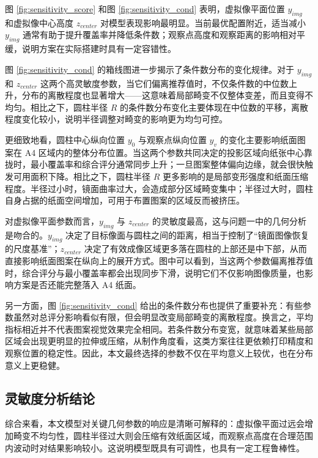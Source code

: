 \documentclass[a4paper,12pt]{ctexart}
\begin{document}
\par 图 \ref{fig:sensitivity_score} 和图 \ref{fig:sensitivity_cond} 表明，虚拟像平面位置 $y_{img}$ 和虚拟像中心高度 $z_{center}$ 对模型表现影响最明显。当前最优配置附近，适当减小 $y_{img}$ 通常有助于提升覆盖率并降低条件数；观察点高度和观察距离的影响相对平缓，说明方案在实际搭建时具有一定容错性。

\par 图 \ref{fig:sensitivity_cond} 的箱线图进一步揭示了条件数分布的变化规律。对于 $y_{img}$ 和 $z_{center}$ 这两个高灵敏度参数，当它们偏离推荐值时，不仅条件数的中位数上升，分布的离散程度也显著增大——这意味着局部畸变不仅整体变差，而且变得不均匀。相比之下，圆柱半径 $R$ 的条件数分布变化主要体现在中位数的平移，离散程度变化较小，说明半径调整对畸变的影响更为均匀可控。

\par 更细致地看，圆柱中心纵向位置 $y_0$ 与观察点纵向位置 $y_v$ 的变化主要影响纸面图案在 A4 区域内的整体分布位置。当这两个参数共同决定的投影区域向纸张中心靠拢时，最小覆盖率和综合评分通常同步上升；一旦图案整体偏向边缘，就会很快触发可用面积下降。相比之下，圆柱半径 $R$ 更多影响的是局部变形强度和纸面压缩程度。半径过小时，镜面曲率过大，会造成部分区域畸变集中；半径过大时，圆柱自身占据的纸面空间增加，可用于布置图案的区域反而被挤压。

\par 对虚拟像平面参数而言，$y_{img}$ 与 $z_{center}$ 的灵敏度最高，这与问题一中的几何分析是吻合的。$y_{img}$ 决定了目标像面与圆柱之间的距离，相当于控制了“镜面图像恢复的尺度基准”；$z_{center}$ 决定了有效成像区域更多落在圆柱的上部还是中下部，从而直接影响纸面图案在纵向上的展开方式。图中可以看到，当这两个参数偏离推荐值时，综合评分与最小覆盖率都会出现同步下滑，说明它们不仅影响图像质量，也影响方案是否还能完整落入 A4 纸面。

\par 另一方面，图 \ref{fig:sensitivity_cond} 给出的条件数分布也提供了重要补充：有些参数虽然对总评分影响看似有限，但会明显改变局部畸变的离散程度。换言之，平均指标相近并不代表图案视觉效果完全相同。若条件数分布变宽，就意味着某些局部区域会出现更明显的拉伸或压缩，从制作角度看，这类方案往往更依赖打印精度和观察位置的稳定性。因此，本文最终选择的参数不仅在平均意义上较优，也在分布意义上更稳健。

\subsection{灵敏度分析结论}
\par 综合来看，本文模型对关键几何参数的响应是清晰可解释的：虚拟像平面过远会增加畸变不均匀性，圆柱半径过大则会压缩有效纸面区域，而观察点高度在合理范围内波动时对结果影响较小。这说明模型既具有可调性，也具有一定工程鲁棒性。
\end{document}
